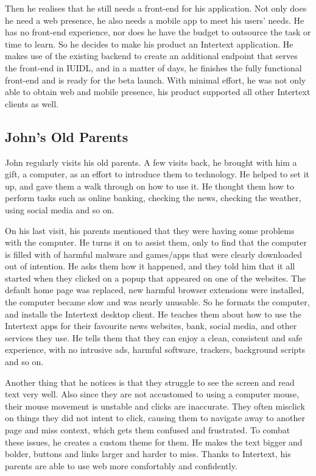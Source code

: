 Then he realises that he still needs a front-end for his application. Not only does he need a web presence, he also needs a mobile app to meet his users' needs. He has no front-end experience, nor does he have the budget to outsource the task or time to learn. So he decides to make his product an Intertext application. He makes use of the existing backend to create an additional endpoint that serves the front-end in IUIDL, and in a matter of days, he finishes the fully functional front-end and is ready for the beta launch. With minimal effort, he was not only able to obtain web and mobile presence, his product supported all other Intertext clients as well.

\subsection{John's Old Parents}

John regularly visits his old parents. A few visits back, he brought with him a gift, a computer, as an effort to introduce them to technology. He helped to set it up, and gave them a walk through on how to use it. He thought them how to perform tasks such as online banking, checking the news, checking the weather, using social media and so on. 

On his last visit, his parents mentioned that they were having some problems with the computer. He turns it on to assist them, only to find that the computer is filled with of harmful malware and games/apps that were clearly downloaded out of intention. He asks them how it happened, and they told him that it all started when they clicked  on a popup that appeared on one of the websites. The default home page was replaced, new harmful browser extensions were installed, the computer became slow and was nearly unusable. So he formats the computer, and installs the Intertext desktop client. He teaches them about how to use the Intertext apps for their favourite news websites, bank, social media, and other services they use. He tells them that they can enjoy a clean, consistent and safe experience, with no intrusive ads, harmful software, trackers, background scripts and so on. 

Another thing that he notices is that they struggle to see the screen and read text very well. Also since they are not accustomed to using a computer mouse, their mouse movement is unstable and clicks are inaccurate. They often misclick on things they did not intent to click, causing them to navigate away to another page and miss context, which gets them confused and frustrated. To combat these issues, he creates a custom theme for them. He makes the text bigger and bolder, buttons and links larger and harder to miss. Thanks to Intertext, his parents are able to use web more comfortably and confidently.

